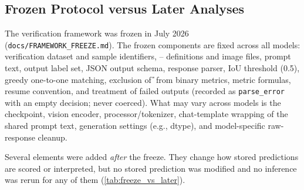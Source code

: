 \subsection{Frozen Protocol versus Later Analyses}
\label{sec:method:freeze}
The verification framework was frozen in July 2026
(\texttt{docs/FRAMEWORK\_FREEZE.md}). The frozen components are fixed across all
models: verification dataset and sample identifiers, --
definitions and image files, prompt text, output label set, JSON output schema,
response parser, IoU threshold (0.5), greedy one-to-one matching, exclusion of
\U{} from binary metrics, metric formulas, resume convention, and treatment of
failed outputs (recorded as \texttt{parse\_error} with an empty decision; never
coerced). What may vary across models is the checkpoint, vision encoder,
processor/tokenizer, chat-template wrapping of the shared prompt text,
generation settings (e.g., dtype), and model-specific raw-response cleanup.

Several elements were added \emph{after} the freeze. They change how stored
predictions are scored or interpreted, but no stored prediction was modified and
no inference was rerun for any of them (\cref{tab:freeze_vs_later}).

